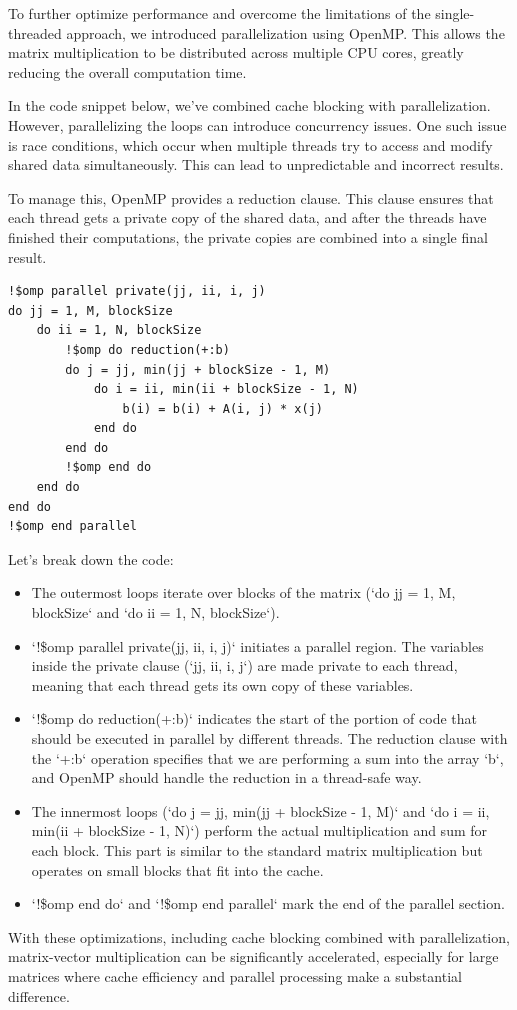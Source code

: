 To further optimize performance and overcome the limitations of the single-threaded approach, we introduced parallelization using OpenMP. This allows the matrix multiplication to be distributed across multiple CPU cores, greatly reducing the overall computation time.

In the code snippet below, we've combined cache blocking with parallelization. However, parallelizing the loops can introduce concurrency issues. One such issue is race conditions, which occur when multiple threads try to access and modify shared data simultaneously. This can lead to unpredictable and incorrect results.

To manage this, OpenMP provides a reduction clause. This clause ensures that each thread gets a private copy of the shared data, and after the threads have finished their computations, the private copies are combined into a single final result.

\begin{lstlisting}
!$omp parallel private(jj, ii, i, j) 
do jj = 1, M, blockSize
    do ii = 1, N, blockSize
        !$omp do reduction(+:b)
        do j = jj, min(jj + blockSize - 1, M)
            do i = ii, min(ii + blockSize - 1, N)
                b(i) = b(i) + A(i, j) * x(j)
            end do
        end do
        !$omp end do
    end do
end do
!$omp end parallel
\end{lstlisting}

\clearpage

Let's break down the code:

\begin{itemize}
    \item The outermost loops iterate over blocks of the matrix (`do jj = 1, M, blockSize` and `do ii = 1, N, blockSize`). 
    
    \item `!\$omp parallel private(jj, ii, i, j)` initiates a parallel region. The variables inside the private clause (`jj, ii, i, j`) are made private to each thread, meaning that each thread gets its own copy of these variables.
    
    \item `!\$omp do reduction(+:b)` indicates the start of the portion of code that should be executed in parallel by different threads. The reduction clause with the `+:b` operation specifies that we are performing a sum into the array `b`, and OpenMP should handle the reduction in a thread-safe way.
    
    \item The innermost loops (`do j = jj, min(jj + blockSize - 1, M)` and `do i = ii, min(ii + blockSize - 1, N)`) perform the actual multiplication and sum for each block. This part is similar to the standard matrix multiplication but operates on small blocks that fit into the cache.
    
    \item `!\$omp end do` and `!\$omp end parallel` mark the end of the parallel section.
\end{itemize}


With these optimizations, including cache blocking combined with parallelization, matrix-vector multiplication can be significantly accelerated, especially for large matrices where cache efficiency and parallel processing make a substantial difference.

